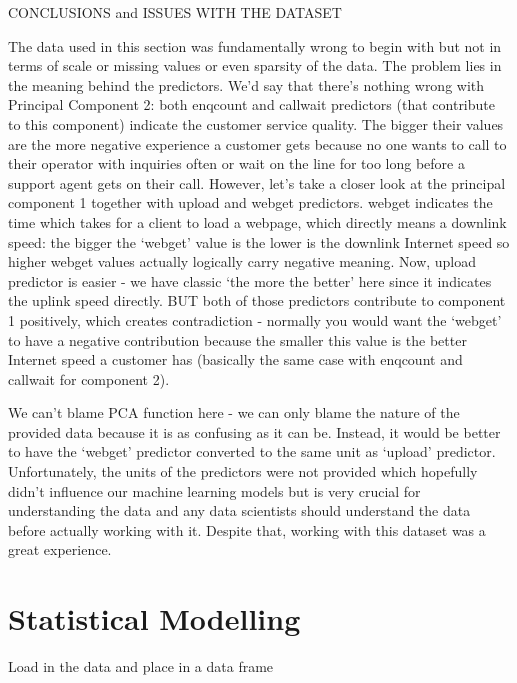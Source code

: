 \documentclass[
]{article}
\begin{document}
CONCLUSIONS and ISSUES WITH THE DATASET

The data used in this section was fundamentally wrong to begin with but
not in terms of scale or missing values or even sparsity of the data.
The problem lies in the meaning behind the predictors. We'd say that
there's nothing wrong with Principal Component 2: both enqcount and
callwait predictors (that contribute to this component) indicate the
customer service quality. The bigger their values are the more negative
experience a customer gets because no one wants to call to their
operator with inquiries often or wait on the line for too long before a
support agent gets on their call. However, let's take a closer look at
the principal component 1 together with upload and webget predictors.
webget indicates the time which takes for a client to load a webpage,
which directly means a downlink speed: the bigger the `webget' value is
the lower is the downlink Internet speed so higher webget values
actually logically carry negative meaning. Now, upload predictor is
easier - we have classic `the more the better' here since it indicates
the uplink speed directly. BUT both of those predictors contribute to
component 1 positively, which creates contradiction - normally you would
want the `webget' to have a negative contribution because the smaller
this value is the better Internet speed a customer has (basically the
same case with enqcount and callwait for component 2).

We can't blame PCA function here - we can only blame the nature of the
provided data because it is as confusing as it can be. Instead, it would
be better to have the `webget' predictor converted to the same unit as
`upload' predictor. Unfortunately, the units of the predictors were not
provided which hopefully didn't influence our machine learning models
but is very crucial for understanding the data and any data scientists
should understand the data before actually working with it. Despite
that, working with this dataset was a great experience.

\hypertarget{statistical-modelling}{%
\section{Statistical Modelling}\label{statistical-modelling}}

Load in the data and place in a data frame
\end{document}
